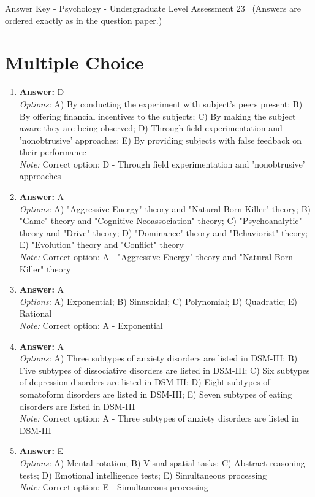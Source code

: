\documentclass[12pt]{article}
\begin{document}
\begin{center}
Answer Key - Psychology - Undergraduate Level Assessment 23 \
\small (Answers are ordered exactly as in the question paper.)
\end{center}

\section*{Multiple Choice}
\begin{enumerate}[label=\arabic*.]
\item \textbf{Answer:} D
\\ \textit{Options:} A) By conducting the experiment with subject's peers present; B) By offering financial incentives to the subjects; C) By making the subject aware they are being observed; D) Through field experimentation and 'nonobtrusive' approaches; E) By providing subjects with false feedback on their performance
\\ \textit{Note:} Correct option: D - Through field experimentation and 'nonobtrusive' approaches
\item \textbf{Answer:} A
\\ \textit{Options:} A) "Aggressive Energy" theory and "Natural Born Killer" theory; B) "Game" theory and "Cognitive Neoassociation" theory; C) "Psychoanalytic" theory and "Drive" theory; D) "Dominance" theory and "Behaviorist" theory; E) "Evolution" theory and "Conflict" theory
\\ \textit{Note:} Correct option: A - "Aggressive Energy" theory and "Natural Born Killer" theory
\item \textbf{Answer:} A
\\ \textit{Options:} A) Exponential; B) Sinusoidal; C) Polynomial; D) Quadratic; E) Rational
\\ \textit{Note:} Correct option: A - Exponential
\item \textbf{Answer:} A
\\ \textit{Options:} A) Three subtypes of anxiety disorders are listed in DSM-III; B) Five subtypes of dissociative disorders are listed in DSM-III; C) Six subtypes of depression disorders are listed in DSM-III; D) Eight subtypes of somatoform disorders are listed in DSM-III; E) Seven subtypes of eating disorders are listed in DSM-III
\\ \textit{Note:} Correct option: A - Three subtypes of anxiety disorders are listed in DSM-III
\item \textbf{Answer:} E
\\ \textit{Options:} A) Mental rotation; B) Visual-spatial tasks; C) Abstract reasoning tests; D) Emotional intelligence tests; E) Simultaneous processing
\\ \textit{Note:} Correct option: E - Simultaneous processing
\end{enumerate}
\end{document}
